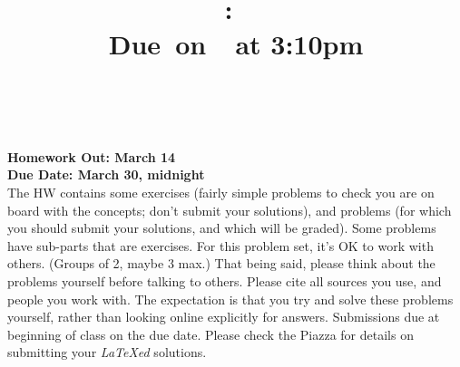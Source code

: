 \documentclass{article}
\title{    \vspace{2in}
    \textmd{\textbf{\hmwkClass:\ \hmwkTitle}}\\
    \normalsize\vspace{0.1in}\small{Due\ on\ \hmwkDueDate\ at 3:10pm}\\
    \vspace{0.1in}\large{\textit{\hmwkClassInstructor\ \hmwkClassTime}}
    \vspace{3in}
}
\author{\hmwkAuthorName}
\date{}
\theoremstyle{plain}
\newcommand{\hmwkAssignedDate}{March 14}
\newcommand{\hmwkDueDate}{March 30, midnight}
\begin{document}

\pagebreak

{\bf Homework Out: \hmwkAssignedDate}\\
{\bf Due Date:  \hmwkDueDate}\\

The HW contains some exercises (fairly simple problems to check you
are on board with the concepts; don’t submit your solutions), and
problems (for which you should submit your solutions, and which will
be graded). Some problems have sub-parts that are exercises.  For this
problem set, it’s OK to work with others. (Groups of 2, maybe 3 max.)
That being said, please think about the problems yourself before
talking to others. Please cite all sources you use, and people you
work with. The expectation is that you try and solve these problems
yourself, rather than looking online explicitly for
answers. Submissions due at beginning of class on the due date.
Please check the Piazza for details on submitting your \emph{LaTeXed}
solutions.

\newcommand{\poly}{\textrm{poly}}
\end{document}
